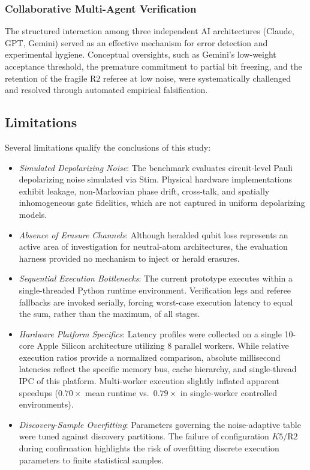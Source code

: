 \subsubsection{Collaborative Multi-Agent Verification}
The structured interaction among three independent AI architectures (Claude, GPT, Gemini) served as an effective mechanism for error detection and experimental hygiene. Conceptual oversights, such as Gemini's low-weight acceptance threshold, the premature commitment to partial bit freezing, and the retention of the fragile $\text{R2}$ referee at low noise, were systematically challenged and resolved through automated empirical falsification.

\subsection{Limitations}

Several limitations qualify the conclusions of this study:
\begin{itemize}
    \item \textit{Simulated Depolarizing Noise}: The benchmark evaluates circuit-level Pauli depolarizing noise simulated via Stim. Physical hardware implementations exhibit leakage, non-Markovian phase drift, cross-talk, and spatially inhomogeneous gate fidelities, which are not captured in uniform depolarizing models.
    \item \textit{Absence of Erasure Channels}: Although heralded qubit loss represents an active area of investigation for neutral-atom architectures, the evaluation harness provided no mechanism to inject or herald erasures.
    \item \textit{Sequential Execution Bottlenecks}: The current prototype executes within a single-threaded Python runtime environment. Verification legs and referee fallbacks are invoked serially, forcing worst-case execution latency to equal the sum, rather than the maximum, of all stages.
    \item \textit{Hardware Platform Specifics}: Latency profiles were collected on a single 10-core Apple Silicon architecture utilizing 8 parallel workers. While relative execution ratios provide a normalized comparison, absolute millisecond latencies reflect the specific memory bus, cache hierarchy, and single-thread IPC of this platform. Multi-worker execution slightly inflated apparent speedups ($0.70\times$ mean runtime vs.\ $0.79\times$ in single-worker controlled environments).
    \item \textit{Discovery-Sample Overfitting}: Parameters governing the noise-adaptive table were tuned against discovery partitions. The failure of configuration $K5/\text{R2}$ during confirmation highlights the risk of overfitting discrete execution parameters to finite statistical samples.
\end{itemize}

